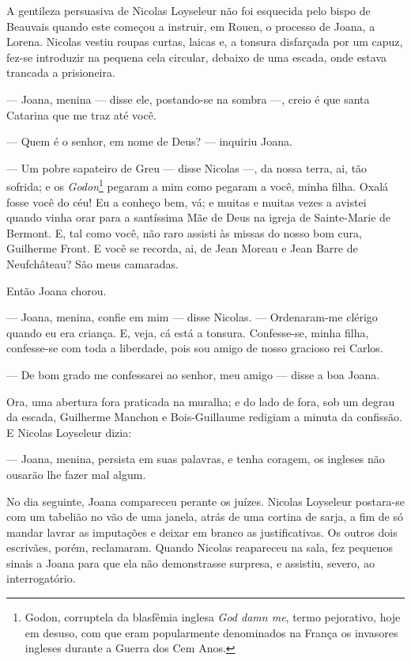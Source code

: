 A gentileza persuasiva de Nicolas Loyseleur não foi esquecida pelo bispo de
Beauvais quando este começou a instruir, em Rouen, o processo de Joana, a
Lorena. Nicolas vestiu roupas curtas, laicas e, a tonsura disfarçada por
um capuz, fez-se introduzir na pequena cela circular, debaixo de uma
escada, onde estava trancada a prisioneira.

--- Joana, menina --- disse ele, postando-se na sombra ---, creio é que santa
Catarina que me traz até você.

--- Quem é o senhor, em nome de Deus? --- inquiriu Joana.

--- Um pobre sapateiro de Greu --- disse Nicolas ---, da nossa terra, ai, tão
sofrida; e os \textit{Godon}\footnote{ Godon, corruptela da blasfêmia
inglesa \textit{God damn me}, termo pejorativo, hoje em desuso, com que
eram popularmente denominados na França os invasores ingleses durante a
Guerra dos Cem Anos.} pegaram a mim como pegaram a você, minha
filha. Oxalá fosse você do céu! Eu a conheço bem, vá; e muitas e muitas
vezes a avistei quando vinha orar para a santíssima Mãe de Deus na igreja
de Sainte-Marie de Bermont. E, tal como você, não raro assisti às missas
do nosso bom cura, Guilherme Front. E você se recorda, ai, de Jean Moreau
e Jean Barre de Neufchâteau? São meus camaradas.

Então Joana chorou.

--- Joana, menina, confie em mim --- disse Nicolas. --- Ordenaram-me clérigo quando
eu era criança. E, veja, cá está a tonsura. Confesse-se, minha filha,
confesse-se com toda a liberdade, pois sou amigo de nosso gracioso rei
Carlos.

--- De bom grado me confessarei ao senhor, meu amigo --- disse a boa Joana.

Ora, uma abertura fora praticada na muralha; e do lado de fora, sob um
degrau da escada, Guilherme Manchon e Bois-Guillaume redigiam a minuta da
confissão. E Nicolas Loyseleur dizia:

--- Joana, menina, persista em suas palavras, e tenha coragem, os ingleses
não ousarão lhe fazer mal algum.

No dia seguinte, Joana compareceu perante os juízes. Nicolas Loyseleur
postara-se com um tabelião no vão de uma janela, atrás de uma cortina de
sarja, a fim de só mandar lavrar as imputações e deixar em branco as
justificativas. Os outros dois escrivães, porém, reclamaram. Quando
Nicolas reapareceu na sala, fez pequenos sinais a Joana para que ela não
demonstrasse surpresa, e assistiu, severo, ao interrogatório.

